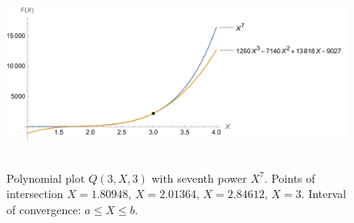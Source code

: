 ﻿\begin{figure}[H]
    \centering
    \includegraphics[width=1\textwidth]{sections/images/06_plots_polynomial_q3_n3_with_seventh}
    ~\caption{Polynomial plot $Q(3, X, 3)$ with seventh power $X^7$.
    Points of intersection $X=1.80948$, $X=2.01364$, $X=2.84612$, $X=3$.
    Interval of convergence: $a \leq X \leq b$.
    }\label{fig:figure12}
\end{figure}
